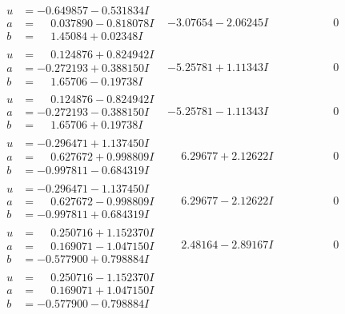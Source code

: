 \documentclass[1p]{elsarticle_modified}
\theoremstyle{definition}
\begin{document}
$$\begin{array}{c|c|c}
\begin{aligned}
u &= -0.649857 - 0.531834 I \\
a &= \phantom{-}0.037890 - 0.818078 I \\
b &= \phantom{-}1.45084 + 0.02348 I\end{aligned}
 & -3.07654 - 2.06245 I & \phantom{-0.000000 } 0 \\ \hline\begin{aligned}
u &= \phantom{-}0.124876 + 0.824942 I \\
a &= -0.272193 + 0.388150 I \\
b &= \phantom{-}1.65706 - 0.19738 I\end{aligned}
 & -5.25781 + 1.11343 I & \phantom{-0.000000 } 0 \\ \hline\begin{aligned}
u &= \phantom{-}0.124876 - 0.824942 I \\
a &= -0.272193 - 0.388150 I \\
b &= \phantom{-}1.65706 + 0.19738 I\end{aligned}
 & -5.25781 - 1.11343 I & \phantom{-0.000000 } 0 \\ \hline\begin{aligned}
u &= -0.296471 + 1.137450 I \\
a &= \phantom{-}0.627672 + 0.998809 I \\
b &= -0.997811 - 0.684319 I\end{aligned}
 & \phantom{-}6.29677 + 2.12622 I & \phantom{-0.000000 } 0 \\ \hline\begin{aligned}
u &= -0.296471 - 1.137450 I \\
a &= \phantom{-}0.627672 - 0.998809 I \\
b &= -0.997811 + 0.684319 I\end{aligned}
 & \phantom{-}6.29677 - 2.12622 I & \phantom{-0.000000 } 0 \\ \hline\begin{aligned}
u &= \phantom{-}0.250716 + 1.152370 I \\
a &= \phantom{-}0.169071 - 1.047150 I \\
b &= -0.577900 + 0.798884 I\end{aligned}
 & \phantom{-}2.48164 - 2.89167 I & \phantom{-0.000000 } 0 \\ \hline\begin{aligned}
u &= \phantom{-}0.250716 - 1.152370 I \\
a &= \phantom{-}0.169071 + 1.047150 I \\
b &= -0.577900 - 0.798884 I\end{aligned}

\end{array}$$
\end{document}

